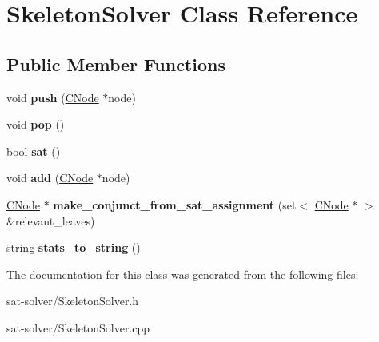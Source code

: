 \hypertarget{classSkeletonSolver}{\section{\-Skeleton\-Solver \-Class \-Reference}
\label{classSkeletonSolver}
}
\subsection*{\-Public \-Member \-Functions}
\begin{DoxyCompactItemize}
\item 
\hypertarget{classSkeletonSolver_a73dfc97133def9a8861467d31af88d8f}{void {\bfseries push} (\hyperlink{classCNode}{\-C\-Node} $\ast$node)}\label{classSkeletonSolver_a73dfc97133def9a8861467d31af88d8f}

\item 
\hypertarget{classSkeletonSolver_ac5eb3646f7d12db27cbb35ad97adc1a8}{void {\bfseries pop} ()}\label{classSkeletonSolver_ac5eb3646f7d12db27cbb35ad97adc1a8}

\item 
\hypertarget{classSkeletonSolver_a88ab27ecb26077e1aa7b774bd2fd2e61}{bool {\bfseries sat} ()}\label{classSkeletonSolver_a88ab27ecb26077e1aa7b774bd2fd2e61}

\item 
\hypertarget{classSkeletonSolver_ad4169e3dccfeb6af299d386b5c5ac4f0}{void {\bfseries add} (\hyperlink{classCNode}{\-C\-Node} $\ast$node)}\label{classSkeletonSolver_ad4169e3dccfeb6af299d386b5c5ac4f0}

\item 
\hypertarget{classSkeletonSolver_a371ded12d64584bd63c986a2f8d92cc4}{\hyperlink{classCNode}{\-C\-Node} $\ast$ {\bfseries make\-\_\-conjunct\-\_\-from\-\_\-sat\-\_\-assignment} (set$<$ \hyperlink{classCNode}{\-C\-Node} $\ast$ $>$ \&relevant\-\_\-leaves)}\label{classSkeletonSolver_a371ded12d64584bd63c986a2f8d92cc4}

\item 
\hypertarget{classSkeletonSolver_a09e5f00e69cadb09da2424481ac429bd}{string {\bfseries stats\-\_\-to\-\_\-string} ()}\label{classSkeletonSolver_a09e5f00e69cadb09da2424481ac429bd}

\end{DoxyCompactItemize}


\-The documentation for this class was generated from the following files\-:\begin{DoxyCompactItemize}
\item 
sat-\/solver/\-Skeleton\-Solver.\-h\item 
sat-\/solver/\-Skeleton\-Solver.\-cpp\end{DoxyCompactItemize}
